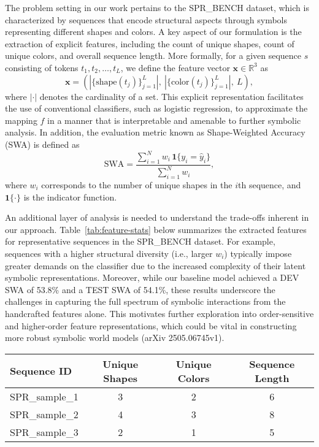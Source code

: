 \documentclass{article}
\begin{document}
The problem setting in our work pertains to the SPR\_BENCH dataset, which is characterized by sequences that encode structural aspects through symbols representing different shapes and colors. A key aspect of our formulation is the extraction of explicit features, including the count of unique shapes, count of unique colors, and overall sequence length. More formally, for a given sequence \(s\) consisting of tokens \(t_1, t_2, \dots, t_L\), we define the feature vector \(\mathbf{x} \in \mathbb{R}^3\) as
\[
\mathbf{x} = \left(\left|\{ \text{shape}(t_j) \}_{j=1}^{L}\right|,\ \left|\{ \text{color}(t_j) \}_{j=1}^{L}\right|,\ L\right),
\]
where \(|\cdot|\) denotes the cardinality of a set. This explicit representation facilitates the use of conventional classifiers, such as logistic regression, to approximate the mapping \(f\) in a manner that is interpretable and amenable to further symbolic analysis. In addition, the evaluation metric known as Shape-Weighted Accuracy (SWA) is defined as
\[
\text{SWA} = \frac{\sum_{i=1}^{N}w_i\, \mathbf{1}\{y_i = \hat{y}_i\}}{\sum_{i=1}^{N}w_i},
\]
where \(w_i\) corresponds to the number of unique shapes in the \(i\)th sequence, and \(\mathbf{1}\{\cdot\}\) is the indicator function.

An additional layer of analysis is needed to understand the trade-offs inherent in our approach. Table~\ref{tab:feature-stats} below summarizes the extracted features for representative sequences in the SPR\_BENCH dataset. For example, sequences with a higher structural diversity (i.e., larger \(w_i\)) typically impose greater demands on the classifier due to the increased complexity of their latent symbolic representations. Moreover, while our baseline model achieved a DEV SWA of 53.8\% and a TEST SWA of 54.1\%, these results underscore the challenges in capturing the full spectrum of symbolic interactions from the handcrafted features alone. This motivates further exploration into order-sensitive and higher-order feature representations, which could be vital in constructing more robust symbolic world models (arXiv 2505.06745v1).

\begin{center}
\begin{tabular}{lccc}
\hline
\textbf{Sequence ID} & \textbf{Unique Shapes} & \textbf{Unique Colors} & \textbf{Sequence Length} \\ \hline
SPR\_sample\_1 & 3 & 2 & 6 \\
SPR\_sample\_2 & 4 & 3 & 8 \\
SPR\_sample\_3 & 2 & 1 & 5 \\ \hline
\end{tabular}
\end{center}
\end{document}
